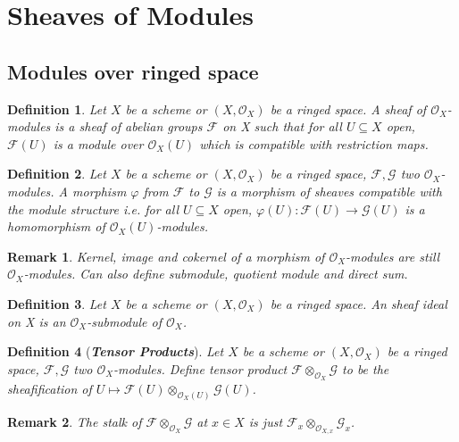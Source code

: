\documentclass{ctexart}
\newtheorem{definition}{Definition}[section]
\newtheorem{remark}{Remark}[section]
\begin{document}
\section{Sheaves of Modules}
\label{section:Sheaves of Modules}

\subsection{Modules over ringed space}
\label{subsection:Sheaves_of_Modules_Modules_over_ringed_space}

\begin{definition}
    Let $X$ be a scheme or $(X, \mathcal{O}_{X})$ be a ringed space.
    A sheaf of $\mathcal{O}_{X}$-modules is a sheaf of abelian groups $\mathcal{F}$ on X such that for all $U \subseteq X$ open, 
    $\mathcal{F}(U)$ is a module over $\mathcal{O}_{X}(U)$ which is compatible with restriction maps.
\end{definition}
\begin{definition}
    Let $X$ be a scheme or $(X, \mathcal{O}_{X})$ be a ringed space, $\mathcal{F},\mathcal{G}$ two $\mathcal{O}_{X}$-modules.
    A morphism $\varphi$ from $\mathcal{F}$ to $\mathcal{G}$ is a morphism of sheaves compatible with the module structure i.e. for all $U \subseteq X$ open, 
    $\varphi(U): \mathcal{F}(U) \longrightarrow \mathcal{G}(U)$ is a homomorphism of $\mathcal{O}_{X}(U)$-modules.
\end{definition}
\begin{remark}
    Kernel, image and cokernel of a morphism of $\mathcal{O}_{X}$-modules are still $\mathcal{O}_{X}$-modules.
    Can also define submodule, quotient module and direct sum.
\end{remark}
\begin{definition}
    Let $X$ be a scheme or $(X, \mathcal{O}_{X})$ be a ringed space.
    An sheaf ideal on X is an $\mathcal{O}_{X}$-submodule of $\mathcal{O}_{X}$.
\end{definition}
\begin{definition}[\textbf{\emph{Tensor Products}}]
    Let $X$ be a scheme or $(X, \mathcal{O}_{X})$ be a ringed space, $\mathcal{F},\mathcal{G}$ two $\mathcal{O}_{X}$-modules.
    Define tensor product $\mathcal{F} \otimes_{\mathcal{O}_{X}} \mathcal{G}$ to be the sheafification of $U \longmapsto \mathcal{F}(U) \otimes_{\mathcal{O}_{X}(U)} \mathcal{G}(U)$.
\end{definition}
\begin{remark}
    The stalk of $\mathcal{F} \otimes_{\mathcal{O}_{X}} \mathcal{G}$ at $x\in X$ is just $\mathcal{F}_{x} \otimes_{\mathcal{O}_{X, x}} \mathcal{G}_{x}$.
\end{remark}
\end{document}
